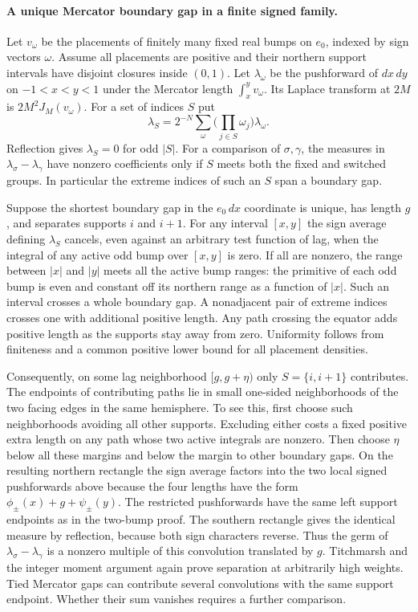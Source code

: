 \documentclass[11pt,letterpaper]{article}
\begin{document}
\paragraph{A unique Mercator boundary gap in a finite signed family.}
Let $v_\omega$ be the placements of finitely many fixed real bumps on $e_0$, indexed by sign vectors $\omega$. Assume all placements are positive and their northern support intervals have disjoint closures inside $(0,1)$. Let $\lambda_\omega$ be the pushforward of $dx\,dy$ on $-1<x<y<1$ under the Mercator length $\int_x^y v_\omega$. Its Laplace transform at $2M$ is $2M^2J_M(v_\omega)$. For a set of indices $S$ put
\[
 \lambda_S=2^{-N}\sum_{\omega}\Big(\prod_{j\in S}\omega_j\Big)\lambda_\omega .
\]
Reflection gives $\lambda_S=0$ for odd $|S|$. For a comparison of $\sigma,\gamma$, the measures in $\lambda_\sigma-\lambda_\gamma$ have nonzero coefficients only if $S$ meets both the fixed and switched groups. In particular the extreme indices of such an $S$ span a boundary gap.

Suppose the shortest boundary gap in the $e_0\,dx$ coordinate is unique, has length $g$, and separates supports $i$ and $i+1$. For any interval $[x,y]$ the sign average defining $\lambda_S$ cancels, even against an arbitrary test function of lag, when the integral of any active odd bump over $[x,y]$ is zero. If all are nonzero, the range between $|x|$ and $|y|$ meets all the active bump ranges: the primitive of each odd bump is even and constant off its northern range as a function of $|x|$. Such an interval crosses a whole boundary gap. A nonadjacent pair of extreme indices crosses one with additional positive length. Any path crossing the equator adds positive length as the supports stay away from zero. Uniformity follows from finiteness and a common positive lower bound for all placement densities.

Consequently, on some lag neighborhood $[g,g+\eta)$ only $S=\{i,i+1\}$ contributes. The endpoints of contributing paths lie in small one-sided neighborhoods of the two facing edges in the same hemisphere. To see this, first choose such neighborhoods avoiding all other supports. Excluding either costs a fixed positive extra length on any path whose two active integrals are nonzero. Then choose $\eta$ below all these margins and below the margin to other boundary gaps. On the resulting northern rectangle the sign average factors into the two local signed pushforwards above because the four lengths have the form $\phi_\pm(x)+g+\psi_\pm(y)$. The restricted pushforwards have the same left support endpoints as in the two-bump proof. The southern rectangle gives the identical measure by reflection, because both sign characters reverse. Thus the germ of $\lambda_\sigma-\lambda_\gamma$ is a nonzero multiple of this convolution translated by $g$. Titchmarsh and the integer moment argument again prove separation at arbitrarily high weights. Tied Mercator gaps can contribute several convolutions with the same support endpoint. Whether their sum vanishes requires a further comparison.
\end{document}
